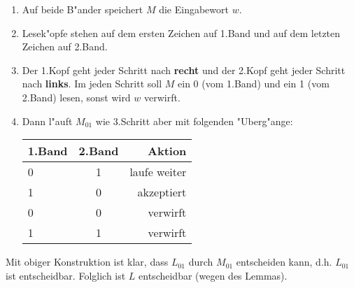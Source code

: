 \documentclass[a4paper,11pt]{scrartcl}
\begin{document}
               \begin{enumerate} 
               \item  Auf beide B"ander speichert $M$ die Eingabewort $w$.
               \item Lesek"opfe stehen auf dem ersten Zeichen auf 1.Band und auf dem letzten Zeichen auf 2.Band.
               \item Der 1.Kopf geht jeder Schritt nach \textbf{recht} und der 2.Kopf geht jeder Schritt nach \textbf{links}. Im jeden Schritt
                      soll $M$ ein 0 (vom 1.Band) und ein 1 (vom 2.Band) lesen, sonst wird $w$ verwirft.
               \item Dann l"auft $M_{01}$ wie 3.Schritt aber mit folgenden "Uberg"ange:
              
                \begin{tabular} {| l | c | r |}
                \hline
                1.Band & 2.Band & Aktion \\
                \hline
                0 & 1 & laufe weiter \\
                \hline
                1 & 0 & akzeptiert \\
                \hline
                0 & 0 & verwirft \\
                \hline
                1 & 1 & verwirft \\
                \hline
               
               \end{tabular}
               
               \end{enumerate}
	   
	\noindent   Mit obiger Konstruktion ist klar, dass $L_{01}$ durch $M_{01}$ entscheiden kann, d.h. $L_{01}$ ist entscheidbar.
	   Folglich ist $L$ entscheidbar (wegen des Lemmas).
	   
	
\end{document}
